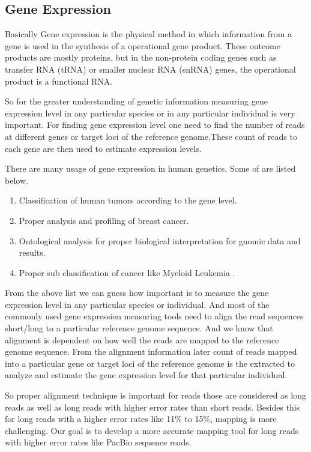 \documentclass{standalone}
\begin{document}
\subsection{Gene Expression}
Basically Gene expression is the physical method in which information from a gene is used in the synthesis of a operational gene product. These outcome products are mostly proteins, but in the non-protein coding genes such as transfer RNA (tRNA) or smaller nuclear RNA (snRNA) genes, the operational product is a functional RNA.
\par
So for the greater understanding of genetic information measuring gene expression level in any particular species or in any particular individual is very important. For finding gene expression level one need to find the number of reads at different genes or target loci of the reference genome.These count of reads to each gene are then used to estimate expression levels.
\par 
There are many usage of gene expression in human genetics. Some of are listed below.
\begin{enumerate}
	\item Classification of human tumors according to the gene level.\cite{geneC}
	\item Proper analysis and profiling of breast cancer.\cite{geneB}
	\item Ontological analysis for proper biological interpretation for gnomic data and results.\cite{geneO}
	\item Proper sub classification of cancer like Myeloid Leukemia .\cite{geneL}  
\end{enumerate}
\par 
From the above list we can guess how important is to measure the gene expression level in any particular species or individual. And most of the commonly used gene expression measuring tools need to align the read sequences short/long to a particular reference genome sequence. And we know that alignment is dependent on how well the reads are mapped to the reference genome sequence. From the alignment information later count of reads mapped into a particular gene or target loci of the reference genome is the extracted to analyze and estimate the gene expression level for that particular individual.
\par 
So proper alignment technique is important for reads those are considered as long reads as well as long reads with higher error rates than short reads.  Besides this for long reads with a higher error rates like 11\% to 15\%, mapping is more challenging. Our goal is to develop a more accurate mapping tool for long reads with higher error rates like PacBio\cite{geneP} sequence reads. 
\end{document}
